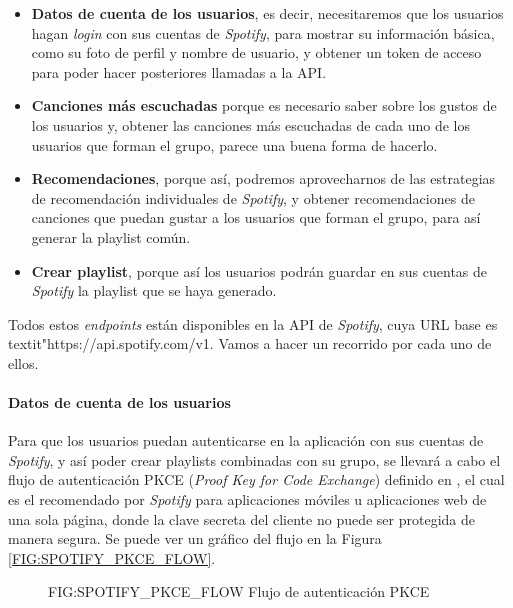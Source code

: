 \begin{itemize}
  \item \textbf{Datos de cuenta de los usuarios}, es decir, necesitaremos que los usuarios hagan 
  \textit{login} con sus cuentas de \textit{Spotify}, para mostrar su información básica, como su foto de
   perfil y nombre de usuario, y obtener un token de acceso para poder hacer posteriores llamadas a la API.
  \item \textbf{Canciones más escuchadas} porque es necesario saber sobre los gustos de los usuarios y,
  obtener las canciones más escuchadas de cada uno de los usuarios que forman el grupo, parece una buena forma de hacerlo.
  \item \textbf{Recomendaciones}, porque así, podremos aprovecharnos de las estrategias de recomendación 
  individuales de \textit{Spotify}, y obtener recomendaciones de canciones que puedan gustar a los usuarios 
  que forman el grupo, para así generar la playlist común.
  \item \textbf{Crear playlist}, porque así los usuarios podrán guardar en sus cuentas de \textit{Spotify} la
  playlist que se haya generado.
\end{itemize}

Todos estos \textit{endpoints} están disponibles en la API de \textit{Spotify}, cuya URL base es textit{"https://api.spotify.com/v1}. Vamos a hacer un recorrido por cada uno de ellos.

\paragraph{Datos de cuenta de los usuarios\label{subsec:datos_cuenta_usuarios}}

Para que los usuarios puedan autenticarse en la aplicación con sus cuentas de \textit{Spotify}, y así poder crear playlists 
combinadas con su grupo, se llevará a cabo el flujo de autenticación PKCE 
(\textit{Proof Key for Code Exchange}) definido en \cite{spotify_pkce}, el cual es el recomendado por 
\textit{Spotify} para aplicaciones móviles u aplicaciones web de una sola página, donde la clave secreta
del cliente no puede ser protegida de manera segura. Se puede ver un gráfico del flujo en la Figura \ref{FIG:SPOTIFY_PKCE_FLOW}.

\begin{figure}[Flujo de autenticación PKCE]{FIG:SPOTIFY_PKCE_FLOW}
    {Flujo de autenticación PKCE}
\end{figure}

